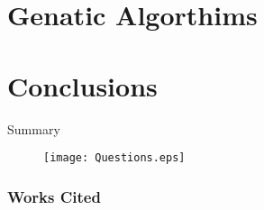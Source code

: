 \documentclass[compress]{beamer}
\begin{document}
\section{Genatic Algorthims}


\section{Conclusions}
\begin{frame}{Summary}

\begin{figure}
	\centering
  \texttt{[image: Questions.eps]}
\end{figure}
\end{frame}

\begin{frame}
\frametitle{Works Cited}
	\tiny
  
\end{frame}

\end{document}
